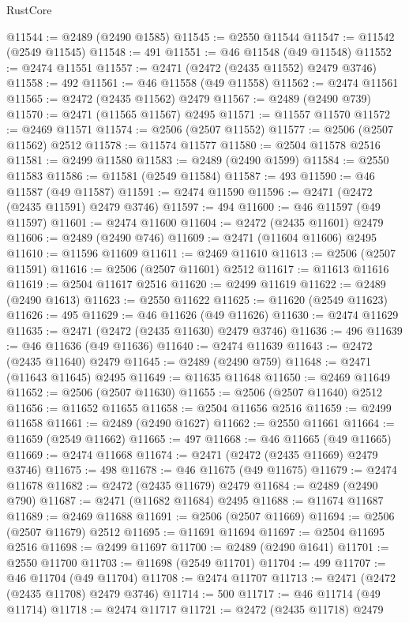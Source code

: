 \begin{lexlean}{RustCore}
\begin{coremodule}
@11544 := @2489 (@2490 @1585)
@11545 := @2550 @11544
@11547 := @11542 (@2549 @11545)
@11548 := 491
@11551 := @46 @11548 (@49 @11548)
@11552 := @2474 @11551
@11557 := @2471 (@2472 (@2435 @11552) @2479 @3746)
@11558 := 492
@11561 := @46 @11558 (@49 @11558)
@11562 := @2474 @11561
@11565 := @2472 (@2435 @11562) @2479
@11567 := @2489 (@2490 @739)
@11570 := @2471 (@11565 @11567) @2495
@11571 := @11557 @11570
@11572 := @2469 @11571
@11574 := @2506 (@2507 @11552)
@11577 := @2506 (@2507 @11562) @2512
@11578 := @11574 @11577
@11580 := @2504 @11578 @2516
@11581 := @2499 @11580
@11583 := @2489 (@2490 @1599)
@11584 := @2550 @11583
@11586 := @11581 (@2549 @11584)
@11587 := 493
@11590 := @46 @11587 (@49 @11587)
@11591 := @2474 @11590
@11596 := @2471 (@2472 (@2435 @11591) @2479 @3746)
@11597 := 494
@11600 := @46 @11597 (@49 @11597)
@11601 := @2474 @11600
@11604 := @2472 (@2435 @11601) @2479
@11606 := @2489 (@2490 @746)
@11609 := @2471 (@11604 @11606) @2495
@11610 := @11596 @11609
@11611 := @2469 @11610
@11613 := @2506 (@2507 @11591)
@11616 := @2506 (@2507 @11601) @2512
@11617 := @11613 @11616
@11619 := @2504 @11617 @2516
@11620 := @2499 @11619
@11622 := @2489 (@2490 @1613)
@11623 := @2550 @11622
@11625 := @11620 (@2549 @11623)
@11626 := 495
@11629 := @46 @11626 (@49 @11626)
@11630 := @2474 @11629
@11635 := @2471 (@2472 (@2435 @11630) @2479 @3746)
@11636 := 496
@11639 := @46 @11636 (@49 @11636)
@11640 := @2474 @11639
@11643 := @2472 (@2435 @11640) @2479
@11645 := @2489 (@2490 @759)
@11648 := @2471 (@11643 @11645) @2495
@11649 := @11635 @11648
@11650 := @2469 @11649
@11652 := @2506 (@2507 @11630)
@11655 := @2506 (@2507 @11640) @2512
@11656 := @11652 @11655
@11658 := @2504 @11656 @2516
@11659 := @2499 @11658
@11661 := @2489 (@2490 @1627)
@11662 := @2550 @11661
@11664 := @11659 (@2549 @11662)
@11665 := 497
@11668 := @46 @11665 (@49 @11665)
@11669 := @2474 @11668
@11674 := @2471 (@2472 (@2435 @11669) @2479 @3746)
@11675 := 498
@11678 := @46 @11675 (@49 @11675)
@11679 := @2474 @11678
@11682 := @2472 (@2435 @11679) @2479
@11684 := @2489 (@2490 @790)
@11687 := @2471 (@11682 @11684) @2495
@11688 := @11674 @11687
@11689 := @2469 @11688
@11691 := @2506 (@2507 @11669)
@11694 := @2506 (@2507 @11679) @2512
@11695 := @11691 @11694
@11697 := @2504 @11695 @2516
@11698 := @2499 @11697
@11700 := @2489 (@2490 @1641)
@11701 := @2550 @11700
@11703 := @11698 (@2549 @11701)
@11704 := 499
@11707 := @46 @11704 (@49 @11704)
@11708 := @2474 @11707
@11713 := @2471 (@2472 (@2435 @11708) @2479 @3746)
@11714 := 500
@11717 := @46 @11714 (@49 @11714)
@11718 := @2474 @11717
@11721 := @2472 (@2435 @11718) @2479

\end{coremodule}
\end{lexlean}
